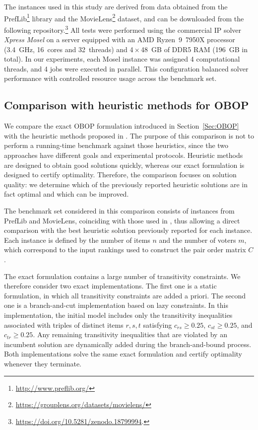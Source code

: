 \documentclass[pdflatex,basic,Numbered]{jnl}%
\theoremstyle{plain}
\theoremstyle{remark}
\theoremstyle{thmstyleone}%
\theoremstyle{thmstylethree}%
\begin{document}
The instances used in this study are derived from data obtained from the PrefLib\footnote{\url{http://www.preflib.org/}} library and the MovieLens\footnote{\url{https://grouplens.org/datasets/movielens/}} dataset, and can be downloaded from the following repository.\footnote{\url{https://doi.org/10.5281/zenodo.18799994}.} All tests were performed using the commercial IP solver \textit{Xpress Mosel} on a server equipped with an AMD Ryzen~9~7950X processor (3.4~GHz, 16~cores and 32~threads) and 4\,$\times$\,48~GB of DDR5 RAM (196~GB in total). In our experiments, each Mosel instance was assigned 4 computational threads, and 4 jobs were executed in parallel. This configuration balanced solver performance with controlled resource usage across the benchmark set.

\subsection{Comparison with heuristic methods for {\rm OBOP}}

We compare the exact {\rm OBOP} formulation introduced in Section~\ref{Sec:OBOP} with the heuristic methods proposed in \cite{aledo2018approaching}. The purpose of this comparison is not to perform a running-time benchmark against those heuristics, since the two approaches have different goals and experimental protocols. Heuristic methods are designed to obtain good solutions quickly, whereas our exact formulation is designed to certify optimality. Therefore, the comparison focuses on solution quality: we determine which of the previously reported heuristic solutions are in fact optimal and which can be improved.

The benchmark set considered in this comparison consists of instances from PrefLib and MovieLens, coinciding with those used in \cite{aledo2018approaching}, thus allowing a direct comparison with the best heuristic solution previously reported for each instance. Each instance is defined by the number of items \(n\) and the number of voters \(m\), which correspond to the input rankings used to construct the pair order matrix \(C\).

The exact formulation contains a large number of transitivity constraints. We therefore consider two exact implementations. The first one is a static formulation, in which all transitivity constraints are added a priori. The second one is a branch-and-cut implementation based on lazy constraints. In this implementation, the initial model includes only the transitivity inequalities associated with triples of distinct items \(r,s,t\) satisfying \(c_{rs} \geq 0.25\), \(c_{st} \geq 0.25\), and \(c_{tr} \geq 0.25\). Any remaining transitivity inequalities that are violated by an incumbent solution are dynamically added during the branch-and-bound process. Both implementations solve the same exact formulation and certify optimality whenever they terminate.
\end{document}
